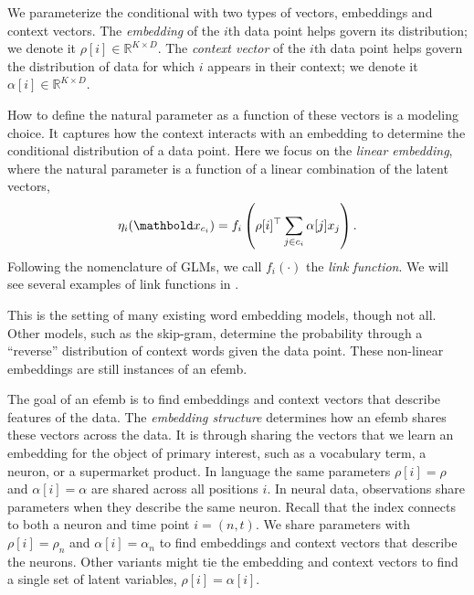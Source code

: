 \documentclass[12pt]{article}
\begin{document}
We parameterize the conditional with two types of vectors, embeddings
and context vectors. The \textit{embedding} of the $i$th data point
helps govern its distribution; we denote it
$\rho[i] \in \mathbb{R}^{K\times D}$. The \textit{context vector} of
the $i$th data point helps govern the distribution of data for which
$i$ appears in their context; we denote it
$\alpha[i] \in \mathbb{R}^{K\times D}$.

How to define the natural parameter as a function of these vectors is
a modeling choice. It captures how the context interacts with an
embedding to determine the conditional distribution of a data point.
Here we focus on the \textit{linear embedding}, where the natural
parameter is a function of a linear combination of the latent vectors,
\begin{align}
  \label{eqn:linear-embedding}
  \eta_i(\mbx_{c_i}) = f_i\left(\rho[i]^\top \sum_{j \in c_i} \alpha[j] x_j \right).
\end{align}
Following the nomenclature of \glspl{GLM}, we call $f_i(\cdot)$ the
\textit{link function}.  We will see several examples of link
functions in .

This is the setting of many existing word embedding models, though not
all. Other models, such as the skip-gram, determine the probability
through a ``reverse'' distribution of context words given the data
point. These non-linear embeddings are still
instances of an \gls{efemb}.

 The goal of an \gls{efemb} is to find
embeddings and context vectors that describe features of the data. The
\textit{embedding structure} determines how an \gls{efemb} shares
these vectors across the data. It is through sharing the vectors that
we learn an embedding for the object of primary interest, such as a
vocabulary term, a neuron, or a supermarket product.
%
In language the same parameters $\rho[i] = \rho$ and
$\alpha[i] = \alpha$ are shared across all positions $i$. In neural
data, observations share parameters when they describe the same
neuron. Recall that the index connects to both a neuron and time point
$i=(n,t)$. We share parameters with $\rho[i] = \rho_n$ and
$\alpha[i] =\alpha_n$ to find embeddings and context vectors that
describe the neurons. Other variants might tie the embedding and
context vectors to find a single set of latent variables,
$\rho[i] = \alpha[i]$.
\end{document}
